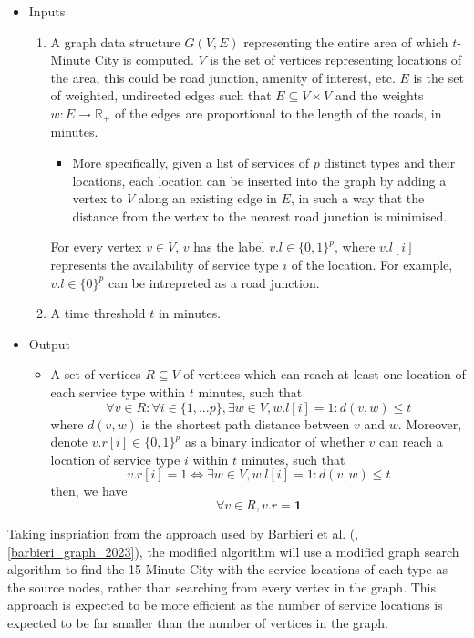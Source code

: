 \begin{itemize}
    \item Inputs
    \begin{enumerate}
        \item A graph data structure $G(V,E)$ representing the entire area of which $t$-Minute City is computed. $V$ is the set of vertices representing locations of the area, this could be road junction, amenity of interest, etc. $E$ is the set of weighted, undirected edges such that $E\subseteq V\times V$ and the weights $w:E\rightarrow\mathbb{R}_{+}$ of the edges are proportional to the length of the roads, in minutes.
        \begin{itemize}
            \item More specifically, given a list of services of $p$ distinct types and their locations, each location can be inserted into the graph by adding a vertex to $V$ along an existing edge in $E$, in such a way that the distance from the vertex to the nearest road junction is minimised.
        \end{itemize}
        For every vertex $v\in V$, $v$ has the label $v.l\in\{0,1\}^p$, where $v.l[i]$ represents the availability of service type $i$ of the location. For example, $v.l\in\{0\}^p$ can be intrepreted as a road junction.
        \item A time threshold $t$ in minutes.
    \end{enumerate}
    \item Output
    \begin{itemize}
        \item[] A set of vertices $R\subseteq V$ of vertices which can reach at least one location of each service type within $t$ minutes, such that        $$\forall v\in R:\forall i\in\{1,...p\},\exists w\in V, w.l[i]=1:d(v,w)\leq t$$ where $d(v,w)$ is the shortest path distance between $v$ and $w$. Moreover, denote $v.r[i]\in\{0,1\}^p$ as a binary indicator of whether $v$ can reach a location of service type $i$ within $t$ minutes, such that $$v.r[i]=1\iff\exists w\in V, w.l[i]=1:d(v,w)\leq t$$ then, we have $$\forall v\in R, v.r = \mathbf{1}$$
    \end{itemize}
\end{itemize}

Taking inspriation from the approach used by Barbieri et al. (\cite{barbieri_graph_2023}, \ref{barbieri_graph_2023}), the modified algorithm will use a modified graph search algorithm to find the 15-Minute City with the service locations of each type as the source nodes, rather than searching from every vertex in the graph. This approach is expected to be more efficient as the number of service locations is expected to be far smaller than the number of vertices in the graph.

